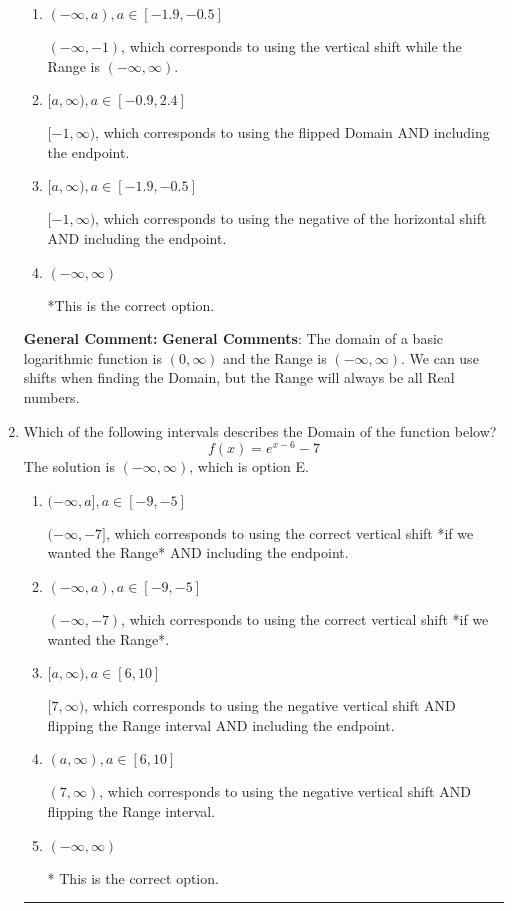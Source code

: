 \documentclass{extbook}[14pt]
\newcommand{\litem}[1]{\item #1

\rule{\textwidth}{0.4pt}}
\begin{document}
\begin{enumerate}
{\begin{enumerate}[label=\Alph*.]
$(-\infty, 1)$, which corresponds to using the using the negative of vertical shift on $(0, \infty)$.
\item \( (-\infty, a), a \in [-1.9, -0.5] \)

$(-\infty, -1)$, which corresponds to using the vertical shift while the Range is $(-\infty, \infty)$.
\item \( [a, \infty), a \in [-0.9, 2.4] \)

$[-1, \infty)$, which corresponds to using the flipped Domain AND including the endpoint.
\item \( [a, \infty), a \in [-1.9, -0.5] \)

$[-1, \infty)$, which corresponds to using the negative of the horizontal shift AND including the endpoint.
\item \( (-\infty, \infty) \)

*This is the correct option.
\end{enumerate}

\textbf{General Comment:} \textbf{General Comments}: The domain of a basic logarithmic function is $(0, \infty)$ and the Range is $(-\infty, \infty)$. We can use shifts when finding the Domain, but the Range will always be all Real numbers.
}
\litem{
Which of the following intervals describes the Domain of the function below?
\[ f(x) = e^{x-6}-7 \]The solution is \( (-\infty, \infty) \), which is option E.\begin{enumerate}[label=\Alph*.]
\item \( (-\infty, a], a \in [-9, -5] \)

$(-\infty, -7]$, which corresponds to using the correct vertical shift *if we wanted the Range* AND including the endpoint.
\item \( (-\infty, a), a \in [-9, -5] \)

$(-\infty, -7)$, which corresponds to using the correct vertical shift *if we wanted the Range*.
\item \( [a, \infty), a \in [6, 10] \)

$[7, \infty)$, which corresponds to using the negative vertical shift AND flipping the Range interval AND including the endpoint.
\item \( (a, \infty), a \in [6, 10] \)

$(7, \infty)$, which corresponds to using the negative vertical shift AND flipping the Range interval.
\item \( (-\infty, \infty) \)

* This is the correct option.
\end{enumerate}

}
\end{enumerate}
\end{document}
